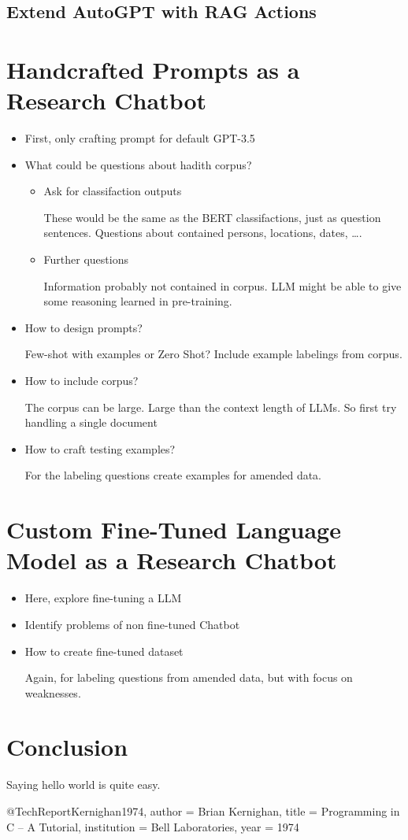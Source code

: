 \documentclass[english, version-2022-01]{uzl-thesis}
\begin{document}
\section{Extend AutoGPT with RAG Actions}

\chapter{Handcrafted Prompts as a Research Chatbot}

\begin{itemize}
	\item First, only crafting prompt for default GPT-3.5
	\item What could be questions about hadith corpus?
	      \begin{itemize}
		      \item Ask for classifaction outputs

		            These would be the same as the BERT classifactions, just as question sentences. Questions about contained persons, locations, dates, \dots.
		      \item Further questions

		            Information probably not contained in corpus. LLM might be able to give some reasoning learned in pre-training.
	      \end{itemize}
	\item How to design prompts?

	      Few-shot with examples or Zero Shot? Include example labelings from corpus.
	\item How to include corpus?

	      The corpus can be large. Large than the context length of LLMs. So first try handling a single document
	\item How to craft testing examples?

	      For the labeling questions create examples for amended data.
\end{itemize}


\chapter{Custom Fine-Tuned Language Model as a Research Chatbot}
\begin{itemize}
	\item Here, explore fine-tuning a LLM
	\item Identify problems of non fine-tuned Chatbot
	\item How to create fine-tuned dataset

	      Again, for labeling questions from amended data, but with focus on weaknesses.
\end{itemize}
\chapter{Conclusion}
Saying hello world is quite easy.
\begin{bibtex-entries}
@TechReport{Kernighan1974,
	author = {Brian Kernighan},
	title = {Programming in C – A Tutorial},
	institution = {Bell Laboratories},
	year = {1974}
}
\end{bibtex-entries}
\end{document}
